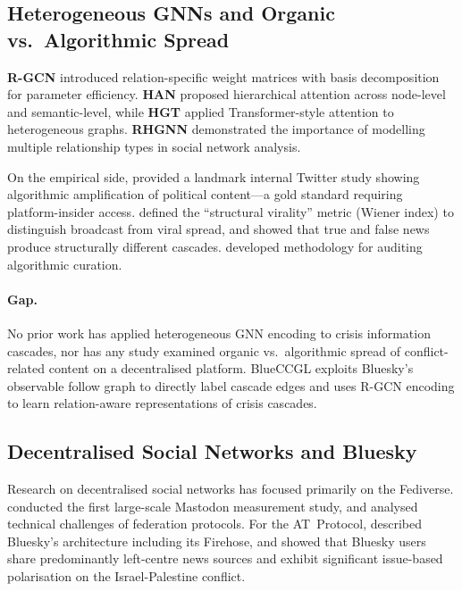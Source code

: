 \documentclass[12pt,a4paper]{article}
\begin{document}
\subsection{Heterogeneous GNNs and Organic vs.\ Algorithmic Spread}

\textbf{R-GCN} \citep{schlichtkrull2018rgcn} introduced relation-specific
weight matrices with basis decomposition for parameter efficiency.  \textbf{HAN}
\citep{wang2019han} proposed hierarchical attention across node-level and
semantic-level, while \textbf{HGT} \citep{hu2020hgt} applied Transformer-style
attention to heterogeneous graphs.  \textbf{RHGNN} \citep{yu2023rhgnn}
demonstrated the importance of modelling multiple relationship types in social
network analysis.

On the empirical side, \citet{huszar2022twitter} provided a landmark internal
Twitter study showing algorithmic amplification of political content---a gold
standard requiring platform-insider access.  \citet{goel2016structural} defined
the ``structural virality'' metric (Wiener index) to distinguish broadcast from
viral spread, and \citet{vosoughi2018spread} showed that true and false news
produce structurally different cascades.  \citet{bandy2021auditing} developed
methodology for auditing algorithmic curation.

\paragraph{Gap.}
No prior work has applied heterogeneous GNN encoding to crisis information
cascades, nor has any study examined organic vs.\ algorithmic spread of
conflict-related content on a decentralised platform.  BlueCCGL exploits
Bluesky's observable follow graph to directly label cascade edges and uses R-GCN
encoding to learn relation-aware representations of crisis cascades.

\subsection{Decentralised Social Networks and Bluesky}

Research on decentralised social networks has focused primarily on the
Fediverse.  \citet{zignani2018mastodon} conducted the first large-scale Mastodon
measurement study, and \citet{raman2019challenges} analysed technical challenges
of federation protocols.  For the AT~Protocol, \citet{kleppmann2024atprotocol}
described Bluesky's architecture including its Firehose, and
\citet{quelle2025bluesky} showed that Bluesky users share predominantly
left-centre news sources and exhibit significant issue-based polarisation on the
Israel-Palestine conflict.
\end{document}
